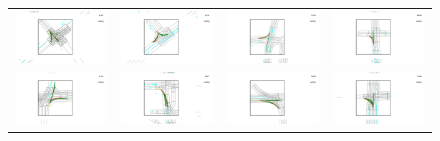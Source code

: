 \begin{figure}[t]
\centering
\setlength{\tabcolsep}{1pt}
\begin{tabular}{cccc}
  \includegraphics[width=0.24\linewidth]{figures/supp/turning1.pdf}
&\includegraphics[width=0.24\linewidth]{figures/supp/turning2.pdf}
&\includegraphics[width=0.24\linewidth]{figures/supp/turning3.pdf}
&\includegraphics[width=0.24\linewidth]{figures/supp/turning4.pdf}\\
\includegraphics[width=0.24\linewidth]{figures/supp/turning5.pdf}
&\includegraphics[width=0.24\linewidth]{figures/supp/turning6.pdf}
&\includegraphics[width=0.24\linewidth]{figures/supp/turning7.pdf}
&\includegraphics[width=0.24\linewidth]{figures/supp/turning8.pdf}\\

\end{tabular}
\end{figure}
